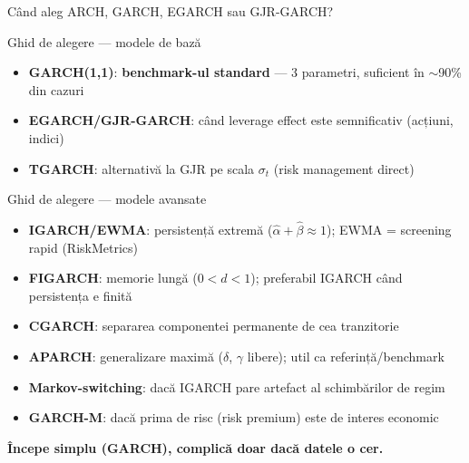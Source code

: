 \documentclass[9pt, aspectratio=169, t]{beamer}
\begin{document}
\begin{frame}{Când aleg ARCH, GARCH, EGARCH sau GJR-GARCH?}
    \small
        \vspace{-0.2cm}
        \begin{block}{Ghid de alegere --- modele de bază}
            \begin{itemize}\setlength{\itemsep}{1pt}
                \item \textbf{GARCH(1,1)}: \textcolor{Forest}{\textbf{benchmark-ul standard}} --- 3 parametri, suficient în $\sim$90\% din cazuri
                \item \textbf{EGARCH/GJR-GARCH}: când leverage effect este semnificativ (acțiuni, indici)
                \item \textbf{TGARCH}: alternativă la GJR pe scala $\sigma_t$ (risk management direct)
            \end{itemize}
        \end{block}
        \vspace{-1.5mm}
        \begin{exampleblock}{Ghid de alegere --- modele avansate}
            \begin{itemize}\setlength{\itemsep}{1pt}
                \item \textbf{IGARCH/EWMA}: persistență extremă ($\hat{\alpha}+\hat{\beta} \approx 1$); EWMA = screening rapid (RiskMetrics)
                \item \textbf{FIGARCH}: memorie lungă ($0 < d < 1$); preferabil IGARCH când persistența e finită
                \item \textbf{CGARCH}: separarea componentei permanente de cea tranzitorie
                \item \textbf{APARCH}: generalizare maximă ($\delta$, $\gamma$ libere); util ca referință/benchmark
                \item \textbf{Markov-switching}: dacă IGARCH pare artefact al schimbărilor de regim
                \item \textbf{GARCH-M}: dacă prima de risc (risk premium) este de interes economic
            \end{itemize}
        \end{exampleblock}
        \vspace{-1mm}
        \begin{center}
            \textcolor{MainBlue}{\textbf{Începe simplu (GARCH), complică doar dacă datele o cer.}}
        \end{center}
\end{frame}
\end{document}
